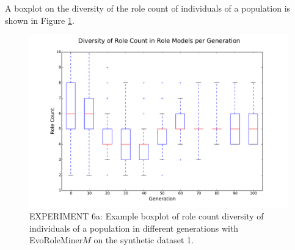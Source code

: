 A boxplot on the diversity of the role count of individuals of a population is shown in Figure \ref{fig:exp6_boxplot}.

\begin{figure}[H]
	\centering
	\includegraphics[scale=0.3]{./Figures/exp6_boxplot}
	\caption{EXPERIMENT 6a: Example boxplot of role count diversity of individuals of a population in different generations with EvoRoleMiner$M$ on the synthetic dataset 1.}
	\label{fig:exp6_boxplot}
\end{figure}